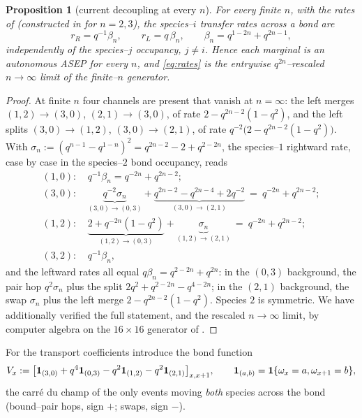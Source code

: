 \documentclass[11pt]{article}
\theoremstyle{plain}
\newtheorem{proposition}[theorem]{Proposition}
\theoremstyle{definition}
\theoremstyle{remark}
\begin{document}
\begin{proposition}[current decoupling at every $n$]\label{prop:decouplen}
For every finite $n$, with the rates of \cite[\S2.1]{REU} (constructed in \cite{KLLPZ}
for $n=2,3$), the species--$i$ transfer rates across a bond are
\[
  r_R=q^{-1}\beta_n,\qquad r_L=q\,\beta_n,\qquad \beta_n=q^{1-2n}+q^{2n-1},
\]
independently of the species--$j$ occupancy, $j\ne i$. Hence each marginal is an
autonomous ASEP for \emph{every} $n$, and \eqref{eq:rates} is the entrywise
$q^{2n}$--rescaled $n\to\infty$ limit of the finite--$n$ generator.
\end{proposition}
\begin{proof}
At finite $n$ four channels are present that vanish at $n=\infty$: the left merges
$(1,2)\to(3,0)$, $(2,1)\to(3,0)$, of rate $2-q^{2n-2}(1-q^2)$, and the left splits
$(3,0)\to(1,2)$, $(3,0)\to(2,1)$, of rate $q^{-2}\big(2-q^{2n-2}(1-q^2)\big)$. With
$\sigma_n:=(q^{n-1}-q^{1-n})^2=q^{2n-2}-2+q^{2-2n}$, the species--$1$ rightward rate,
case by case in the species--$2$ bond occupancy, reads
\begin{align*}
  (1,0)\colon&\ q^{-1}\beta_n=q^{-2n}+q^{2n-2};\\
  (3,0)\colon&\ \underbrace{q^{-2}\sigma_n}_{(3,0)\to(0,3)}
    +\underbrace{q^{2n-2}-q^{2n-4}+2q^{-2}}_{(3,0)\to(2,1)}\ =\ q^{-2n}+q^{2n-2};\\
  (1,2)\colon&\ \underbrace{2+q^{-2n}(1-q^2)}_{(1,2)\to(0,3)}
    +\underbrace{\sigma_n}_{(1,2)\to(2,1)}\ =\ q^{-2n}+q^{2n-2};\\
  (3,2)\colon&\ q^{-1}\beta_n,
\end{align*}
and the leftward rates all equal $q\beta_n=q^{2-2n}+q^{2n}$: in the $(0,3)$
background, the pair hop $q^2\sigma_n$ plus the split $2q^2+q^{2-2n}-q^{4-2n}$; in
the $(2,1)$ background, the swap $\sigma_n$ plus the left merge $2-q^{2n-2}(1-q^2)$.
Species $2$ is symmetric. We have additionally verified the full statement, and the
rescaled $n\to\infty$ limit, by computer algebra on the $16\times16$ generator of
\cite[\S2.1]{REU}.
\end{proof}

For the transport coefficients introduce the bond function
\begin{equation}\label{eq:Vdef}
  V_x:=\big[\mathbf 1_{(3,0)}+q^4\mathbf 1_{(0,3)}-q^2\mathbf 1_{(1,2)}-q^2\mathbf 1_{(2,1)}\big]_{x,x+1},
  \qquad \mathbf 1_{(a,b)}=\mathbf 1\{\omega_x=a,\omega_{x+1}=b\},
\end{equation}
the carr\'e du champ of the only events moving \emph{both} species across the bond
(bound--pair hops, sign $+$; swaps, sign $-$).
\end{document}
